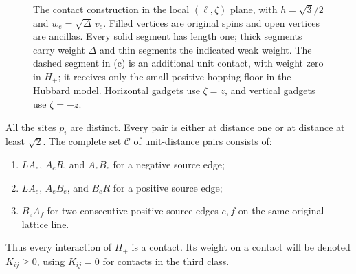 \begin{figure}[tbp]
\caption{The contact construction in the local $(\ell,\zeta)$ plane,
with $h=\sqrt3/2$ and $w_e=\sqrt\Delta\,v_e$.
Filled vertices are original spins and open vertices are ancillas.
Every solid segment has length one; thick segments carry weight
$\Delta$ and thin segments the indicated weak weight.  The dashed
segment in (c) is an additional unit contact, with weight zero in
$H_+$; it receives only the small positive hopping floor in the Hubbard
model.  Horizontal gadgets use $\zeta=z$, and vertical gadgets use
$\zeta=-z$.}
\label{fig:gadgets}
\end{figure}

\begin{lemma}\label{lem:contact-layout}
All the sites $p_i$ are distinct.  Every pair is either at distance one
or at distance at least $\sqrt2$.  The complete set $\mathcal C$ of
unit-distance pairs consists of:
\begin{enumerate}
 \item $L A_e$, $A_e R$, and $A_e B_e$ for a negative source edge;
 \item $L A_e$, $A_e B_e$, and $B_e R$ for a positive source edge;
 \item $B_e A_f$ for two consecutive positive source edges $e,f$ on
       the same original lattice line.
\end{enumerate}
Thus every interaction of $H_+$ is a contact.  Its weight on a contact
will be denoted $K_{ij}\geq0$, using $K_{ij}=0$ for contacts in the
third class.
\end{lemma}

